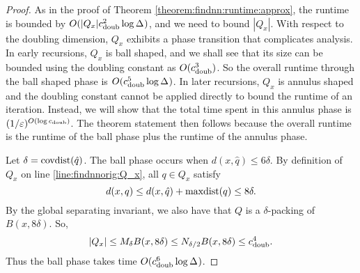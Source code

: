 \documentclass[../main.tex]{subfiles}
\newcommand{\dist}[2]{\distf({#1},{#2})}
\newcommand{\distf}{d}
\newcommand{\aspect}[1]{\Delta_{#1}}
\newcommand{\cdoub}{c_\textnormal{doub}}
\newcommand{\mkfunction}[1]{\ifmmode{\textnormal{{#1}}}}
\newcommand{\covdist}[1]    {\mkfunction{covdist}({#1})}
\newcommand{\maxdist}[1]    {\mkfunction{maxdist}({#1})}
\begin{document}
\begin{proof}
    As in the proof of Theorem \ref{theorem:findnn:runtime:approx}, 
    the runtime is bounded by $O(|Q_x|\cdoub^2\log\aspect{})$,
    and we need to bound $|Q_x|$.
    With respect to the doubling dimension,
    $Q_x$ exhibits a phase transition that complicates analysis.
    In early recursions, $Q_x$ is ball shaped,
    and we shall see that its size can be bounded using the doubling constant as $O(\cdoub^3)$.
    So the overall runtime through the ball shaped phase is $O(\cdoub^5\log\aspect{})$.
    In later recursions, $Q_x$ is annulus shaped and the doubling constant cannot be applied directly to bound the runtime of an iteration.
    Instead, we will show that the total time spent in this annulus phase is $(1/\varepsilon)^{O(\log \cdoub)}$. 
    The theorem statement then follows because the overall runtime is the runtime of the ball phase plus the runtime of the annulus phase.

    Let $\delta = \covdist{\hat q}$.
    The ball phase occurs when $\dist{x}{\hat q} \le 6\delta$.
    By definition of $Q_x$ on line \ref{line:findnnorig:Q_x}, all $q\in Q_x$ satisfy
    \begin{equation}
        \dist{x}{q} \le \dist{x}{\hat q} + \maxdist{q} \le 8\delta
        .
    \end{equation}
    By the global separating invariant,
    we also have that $Q$ is a $\delta$-packing of $B(x,8\delta)$.
    So,
    \begin{equation}
        |Q_x| 
        \le M_\delta B(x,8\delta) 
        \le N_{\delta/2}B(x,8\delta) 
        \le \cdoub^4
        .
    \end{equation}
    Thus the ball phase takes time $O(\cdoub^6\log\aspect{})$.


\end{proof}
\end{document}
